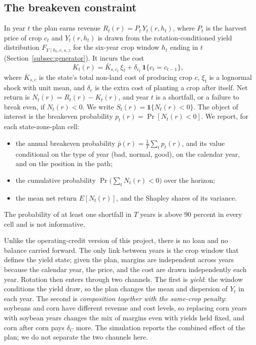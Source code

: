\documentclass[11pt,letterpaper]{article}
\theoremstyle{remark}
\begin{document}
\subsection{\label{subsec:constraint}The breakeven constraint}

In year $t$ the plan earns revenue $R_t(r) = P_t\,Y_t(r, h_t)$, where $P_t$ is the harvest price of crop $c_t$ and $Y_t(r,h_t)$ is drawn from the rotation-conditioned yield distribution $F_{Y\mid h_t,c,s,z}$ for the six-year crop window $h_t$ ending in $t$ (Section~\ref{subsec:generator}). It incurs the cost
\begin{equation}
K_t(r) = \bar K_{s,c_t}\,\xi_t + \delta_{c_t}\,\mathbf 1\{c_t = c_{t-1}\},
\end{equation}
where $\bar K_{s,c}$ is the state's total non-land cost of producing crop $c$, $\xi_t$ is a lognormal shock with unit mean, and $\delta_c$ is the extra cost of planting a crop after itself. Net return is $N_t(r) = R_t(r) - K_t(r)$, and year $t$ is a shortfall, or a failure to break even, if $N_t(r)<0$. We write $S_t(r) = \mathbf 1\{N_t(r)<0\}$. The object of interest is the breakeven probability $p_t(r) = \Pr[N_t(r)<0]$. We report, for each state-zone-plan cell:
\begin{itemize}
\item the annual breakeven probability $\bar p(r) = \frac1T\sum_t p_t(r)$, and its value conditional on the type of year (bad, normal, good), on the calendar year, and on the position in the path;
\item the cumulative probability $\Pr\big(\sum_t N_t(r) < 0\big)$ over the horizon;
\item the mean net return $E[N_t(r)]$, and the Shapley shares of its variance.
\end{itemize}
The probability of at least one shortfall in $T$ years is above 90 percent in every cell and is not informative.

Unlike the operating-credit version of this project, there is no loan and no balance carried forward. The only link between years is the crop window that defines the yield state; given the plan, margins are independent across years because the calendar year, the price, and the cost are drawn independently each year. Rotation then enters through two channels. The first is \emph{yield}: the window conditions the yield draw, so the plan changes the mean and dispersion of $Y_t$ in each year. The second is \emph{composition together with the same-crop penalty}: soybeans and corn have different revenue and cost levels, so replacing corn years with soybean years changes the mix of margins even with yields held fixed, and corn after corn pays $\delta_C$ more. The simulation reports the combined effect of the plan; we do not separate the two channels here.
\end{document}
